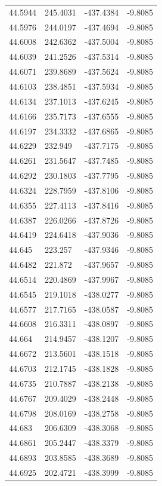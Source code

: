 \begin{table}[H]
\begin{tabular}{llll}
44.5944 & 245.4031 & -437.4384 & -9.8085 \\
44.5976 & 244.0197 & -437.4694 & -9.8085 \\
44.6008 & 242.6362 & -437.5004 & -9.8085 \\
44.6039 & 241.2526 & -437.5314 & -9.8085 \\
44.6071 & 239.8689 & -437.5624 & -9.8085 \\
44.6103 & 238.4851 & -437.5934 & -9.8085 \\
44.6134 & 237.1013 & -437.6245 & -9.8085 \\
44.6166 & 235.7173 & -437.6555 & -9.8085 \\
44.6197 & 234.3332 & -437.6865 & -9.8085 \\
44.6229 & 232.949 & -437.7175 & -9.8085 \\
44.6261 & 231.5647 & -437.7485 & -9.8085 \\
44.6292 & 230.1803 & -437.7795 & -9.8085 \\
44.6324 & 228.7959 & -437.8106 & -9.8085 \\
44.6355 & 227.4113 & -437.8416 & -9.8085 \\
44.6387 & 226.0266 & -437.8726 & -9.8085 \\
44.6419 & 224.6418 & -437.9036 & -9.8085 \\
44.645 & 223.257 & -437.9346 & -9.8085 \\
44.6482 & 221.872 & -437.9657 & -9.8085 \\
44.6514 & 220.4869 & -437.9967 & -9.8085 \\
44.6545 & 219.1018 & -438.0277 & -9.8085 \\
44.6577 & 217.7165 & -438.0587 & -9.8085 \\
44.6608 & 216.3311 & -438.0897 & -9.8085 \\
44.664 & 214.9457 & -438.1207 & -9.8085 \\
44.6672 & 213.5601 & -438.1518 & -9.8085 \\
44.6703 & 212.1745 & -438.1828 & -9.8085 \\
44.6735 & 210.7887 & -438.2138 & -9.8085 \\
44.6767 & 209.4029 & -438.2448 & -9.8085 \\
44.6798 & 208.0169 & -438.2758 & -9.8085 \\
44.683 & 206.6309 & -438.3068 & -9.8085 \\
44.6861 & 205.2447 & -438.3379 & -9.8085 \\
44.6893 & 203.8585 & -438.3689 & -9.8085 \\
44.6925 & 202.4721 & -438.3999 & -9.8085 \\

\end{tabular}
\end{table}
